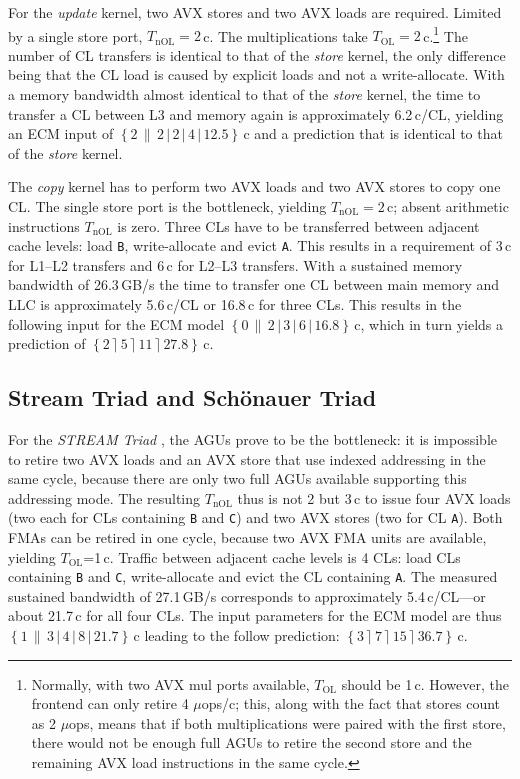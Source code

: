 \documentclass{llncs}
\newcommand{\epsep}{\rceil}
\newcommand{\olsep}{\|}
\newcommand{\nolsep}{|}
\newcommand{\ecmspace}{\,}
\newcommand{\ecm}[6]{\mbox{$\left\{{#1}\ecmspace\olsep\ecmspace {#2}\ecmspace\nolsep\ecmspace {#3}\ecmspace\nolsep\ecmspace {#4}\ecmspace\nolsep\ecmspace {#5}\right\}\ecmspace{#6}$}}
\newcommand{\ecmp}[5]{\mbox{$\left\{{#1}\ecmspace\epsep\ecmspace {#2}\ecmspace\epsep\ecmspace {#3}\ecmspace\epsep\ecmspace {#4}\right\}\ecmspace{#5}$}}
\begin{document}
For the \textit{update} kernel, two AVX stores and two AVX loads are required.
Limited by a single store port, $T_\mathrm{nOL} = 2$\,c.  The multiplications
take $T_\mathrm{OL} = 2$\,c.\footnote{Normally, with two AVX mul ports
available, $T_\mathrm{OL}$ should be 1\,c. However, the frontend can only
retire 4 $\mu$ops/c; this, along with the fact that stores count as 2 $\mu$ops,
means that if both multiplications were paired with the first store, there
would not be enough full AGUs to retire the second store and the remaining AVX
load instructions in the same cycle.} The number of CL transfers is
identical to that of the \textit{store} kernel, the only difference being that
the CL load is caused by explicit loads and not a write-allocate. With a memory
bandwidth almost identical to that of the \textit{store} kernel, the time to
transfer a CL between L3 and memory again is approximately 6.2\,c/CL, yielding
an ECM input of \ecm{2}{2}{2}{4}{12.5}{\mathrm{c}} and a prediction that
is identical to that of the \textit{store} kernel.

The \textit{copy} kernel has to perform two AVX loads and two AVX stores to
copy one CL. The single store port is the bottleneck, yielding
$T_\mathrm{nOL}=2$\,c; absent arithmetic instructions $T_\mathrm{nOL}$ is zero.
Three CLs have to be transferred between adjacent cache levels: load
\texttt{B}, write-allocate and evict \texttt{A}. This results in a requirement
of 3\,c for L1--L2 transfers and 6\,c for L2--L3 transfers.  With a sustained
memory bandwidth of 26.3\,GB/s the time to transfer one CL between main memory
and \ac{LLC} is approximately 5.6\,c/CL or 16.8\,c for three CLs.  This results
in the following input for the ECM model \ecm{0}{2}{3}{6}{16.8}{\mathrm{c}},
which in turn yields a prediction of \ecmp{2}{5}{11}{27.8}{\mathrm{c}}.

\subsection{Stream Triad and Sch\"onauer Triad}

For the \textit{STREAM Triad} \cite{McCalpin:1995}, the \ac{AGU}s prove to be
the bottleneck: it is impossible to retire two AVX loads and an AVX store that
use indexed addressing in the same cycle, because there are only two full
\ac{AGU}s available supporting this addressing mode.  The resulting
$T_\mathrm{nOL}$ thus is not 2 but 3\,c to issue four AVX loads (two each for
CLs containing \texttt{B} and \texttt{C}) and two AVX stores (two for CL
\texttt{A}). Both \ac{FMA}s can be retired in one cycle, because two \ac{AVX}
\ac{FMA} units are available, yielding $T_\mathrm{OL}$=1\,c. Traffic between
adjacent cache levels is 4 CLs: load CLs containing \texttt{B} and \texttt{C},
write-allocate and evict the CL containing \texttt{A}. The measured sustained
bandwidth of 27.1\,GB/s corresponds to approximately 5.4\,c/CL---or about
21.7\,c for all four CLs.  The input parameters for the ECM model are thus
\ecm{1}{3}{4}{8}{21.7}{\mathrm{c}} leading to the follow prediction:
\ecmp{3}{7}{15}{36.7}{\mathrm{c}}.
\end{document}
